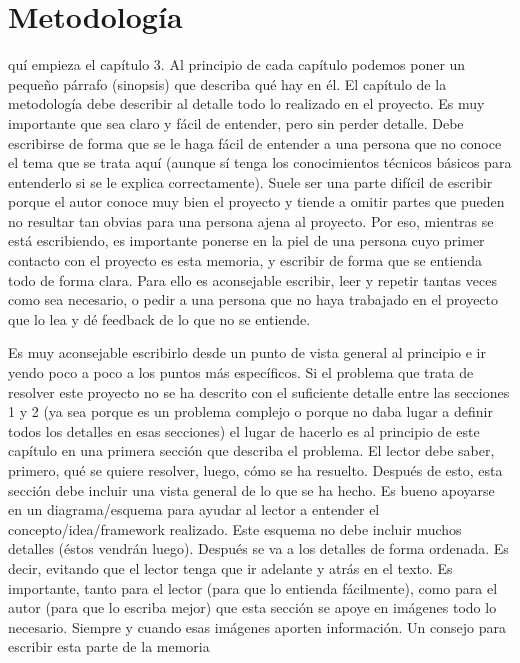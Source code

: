 \documentclass[a4paper,11pt,leqno, twoside]{memoir}
\begin{document}
\chapter{Metodología}
\label{cap:metodologia}
\minitoc
\vspace{1cm}
quí empieza el capítulo 3. Al principio de cada capítulo podemos poner un pequeño párrafo (sinopsis) que describa qué hay en él. El capítulo de la metodología debe describir al detalle todo lo realizado en el proyecto. Es muy importante que sea claro y fácil de entender, pero sin perder detalle. Debe escribirse de forma que se le haga fácil de entender a una persona que no conoce el tema que se trata aquí (aunque sí tenga los conocimientos técnicos básicos para entenderlo si se le explica correctamente). Suele ser una parte difícil de escribir porque el autor conoce muy bien el proyecto y tiende a omitir partes que pueden no resultar tan obvias para una persona ajena al proyecto. Por eso, mientras se está escribiendo, es importante ponerse en la piel de una persona cuyo primer contacto con el proyecto es esta memoria, y escribir de forma que se entienda todo de forma clara. Para ello es aconsejable escribir, leer y repetir tantas veces como sea necesario, o pedir a una persona que no haya trabajado en el proyecto que lo lea y dé feedback de lo que no se entiende. 

Es muy aconsejable escribirlo desde un punto de vista general al principio e ir yendo poco a poco a los puntos más específicos. Si el problema que trata de resolver este proyecto no se ha descrito con el suficiente detalle entre las secciones 1 y 2 (ya sea porque es un problema complejo o porque no daba lugar a definir todos los detalles en esas secciones) el lugar de hacerlo es al principio de este capítulo en una primera sección que describa el problema. El lector debe saber, primero, qué se quiere resolver, luego, cómo se ha resuelto. Después de esto, esta sección debe incluir una vista general de lo que se ha hecho. Es bueno apoyarse en un diagrama/esquema para ayudar al lector a entender el concepto/idea/framework realizado. Este esquema no debe incluir muchos detalles (éstos vendrán luego). Después se va a los detalles de forma ordenada. Es decir, evitando que el lector tenga que ir adelante y atrás en el texto. Es importante, tanto para el lector (para que lo entienda fácilmente), como para el autor (para que lo escriba mejor) que esta sección se apoye en imágenes todo lo necesario. Siempre y cuando esas imágenes aporten información. Un consejo para escribir esta parte de la memoria
\newpage
\end{document}
